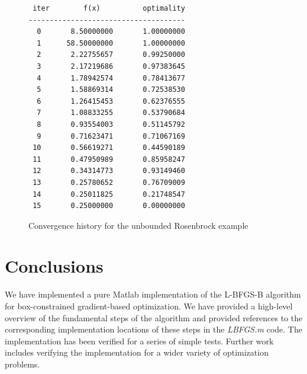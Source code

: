 \documentclass[11pt]{article}
\begin{document}
\begin{figure}[hbt!]
\scriptsize
\centering
\begin{BVerbatim}
 iter        f(x)          optimality
-------------------------------------
  0       8.50000000       1.00000000
  1      58.50000000       1.00000000
  2       2.22755657       0.99250000
  3       2.17219686       0.97383645
  4       1.78942574       0.78413677
  5       1.58869314       0.72538530
  6       1.26415453       0.62376555
  7       1.08833255       0.53790684
  8       0.93554003       0.51145792
  9       0.71623471       0.71067169
 10       0.56619271       0.44590189
 11       0.47950989       0.85958247
 12       0.34314773       0.93149460
 13       0.25780652       0.76709009
 14       0.25011825       0.21748547
 15       0.25000000       0.00000000
\end{BVerbatim}
\caption{Convergence history for the unbounded Rosenbrock example}
\label{fig:ros_con_conv}
\end{figure}

\section{Conclusions}

We have implemented a pure Matlab implementation of
the L-BFGS-B algorithm for box-constrained gradient-based
optimization. We have provided a high-level overview
of the fundamental steps of the algorithm and provided
references to the corresponding implementation
locations of these steps in the \emph{LBFGS.m} code.
The implementation has been verified for a series of
simple tests. Further work includes verifying the
implementation for a wider variety of optimization
problems.
\end{document}
